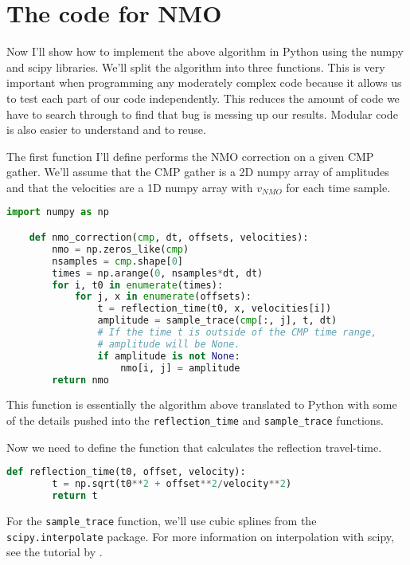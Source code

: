 \section{The code for NMO}

Now I'll show how to implement the above algorithm in Python using the numpy and scipy libraries.
We'll split the algorithm into three functions.
This is very important when programming any moderately complex code because it allows us to test each part of our code independently.
This reduces the amount of code we have to search through to find that bug is messing up our results.
Modular code is also easier to understand and to reuse.

The first function I'll define performs the NMO correction on a given CMP gather.
We'll assume that the CMP gather is a 2D numpy array of amplitudes and that the
velocities are a 1D numpy array with $v_{NMO}$ for each time sample.

\begin{lstlisting}[language=python]
    import numpy as np

    def nmo_correction(cmp, dt, offsets, velocities):
        nmo = np.zeros_like(cmp)
        nsamples = cmp.shape[0]
        times = np.arange(0, nsamples*dt, dt)
        for i, t0 in enumerate(times):
            for j, x in enumerate(offsets):
                t = reflection_time(t0, x, velocities[i])
                amplitude = sample_trace(cmp[:, j], t, dt)
                # If the time t is outside of the CMP time range,
                # amplitude will be None.
                if amplitude is not None:
                    nmo[i, j] = amplitude
        return nmo
\end{lstlisting}

This function is essentially the algorithm above translated to Python with some
of the details pushed into the \texttt{reflection\_time} and
\texttt{sample\_trace} functions.

Now we need to define the function that calculates the reflection travel-time.

\begin{lstlisting}[language=python]
    def reflection_time(t0, offset, velocity):
        t = np.sqrt(t0**2 + offset**2/velocity**2)
        return t
\end{lstlisting}

For the \texttt{sample_trace} function, we'll use cubic splines from the
\texttt{scipy.interpolate} package.
For more information on interpolation with scipy, see the tutorial by
\citet{Hall_2016}.

